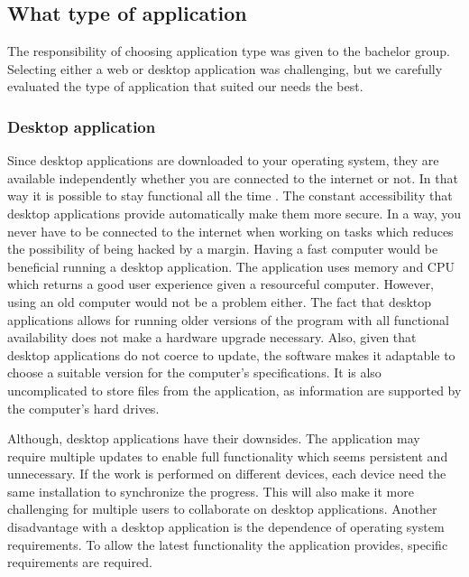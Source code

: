 \subsection{What type of application}
The responsibility of choosing application type was given to the bachelor group. Selecting either a web or desktop application was challenging, but we carefully evaluated the type of application that suited our needs the best. 

\subsubsection*{Desktop application}
Since desktop applications are downloaded to your operating system, they are available independently whether you are connected to the internet or not. In that way it is possible to stay functional all the time \cite{WebVsDesktop}. The constant accessibility that desktop applications provide automatically make them more secure. In a way, you never have to be connected to the internet when working on tasks which reduces the possibility of being hacked by a margin. Having a fast computer would be beneficial running a desktop application. The application uses memory and CPU which returns a good user experience given a resourceful computer. However, using an old computer would not be a problem either. The fact that desktop applications allows for running older versions of the program with all functional availability does not make a hardware upgrade necessary. Also, given that desktop applications do not coerce to update, the software makes it adaptable to choose a suitable version for the computer's specifications. It is also uncomplicated to store files from the application, as information are supported by the computer's hard drives. 

Although, desktop applications have their downsides. The application may require multiple updates to enable full functionality which seems persistent and unnecessary. If the work is performed on different devices, each device need the same installation to synchronize the progress. This will also make it more challenging for multiple users to collaborate on desktop applications. Another disadvantage with a desktop application is the dependence of operating system requirements. To allow the latest functionality the application provides, specific requirements are required. 

